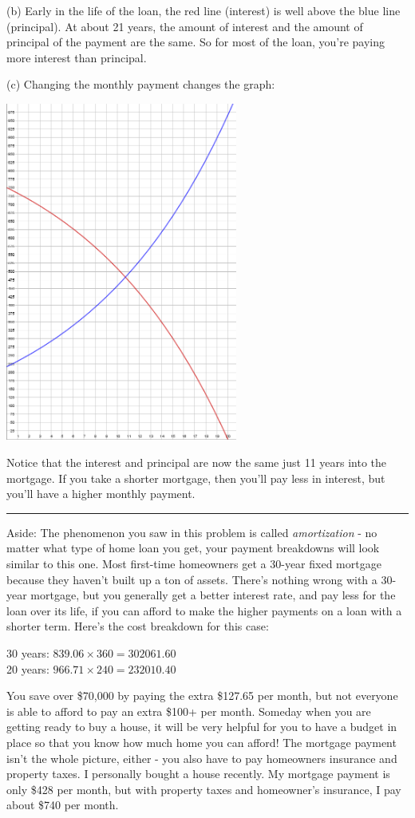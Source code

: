 \documentclass[12pt]{letter}
\newcommand{\?}{\stackrel{?}{=}}
\begin{document}
	(b) Early in the life of the loan, the red line (interest) is well above the blue line (principal). At about 21 years, the amount of interest and the amount of principal of the payment are the same. So for most of the loan, you're paying more interest than principal.
	
	\vfill \newpage
	
	(c) Changing the monthly payment changes the graph:
	
	\includegraphics[width=3in]{5558c.png}
	
	Notice that the interest and principal are now the same just 11 years into the mortgage. If you take a shorter mortgage, then you'll pay less in interest, but you'll have a higher monthly payment. \\ \hrule
	
	Aside: The phenomenon you saw in this problem is called \textit{amortization} - no matter what type of home loan you get, your payment breakdowns will look similar to this one. Most first-time homeowners get a 30-year fixed mortgage because they haven't built up a ton of assets. There's nothing wrong with a 30-year mortgage, but you generally get a better interest rate, and pay less for the loan over its life, if you can afford to make the higher payments on a loan with a shorter term. Here's the cost breakdown for this case:
	
	30 years: $839.06\times 360 = 302061.60$ \\
	20 years: $966.71 \times 240 = 232010.40$
	
	You save over \$70,000 by paying the extra \$127.65 per month, but not everyone is able to afford to pay an extra \$100+ per month. Someday when you are getting ready to buy a house, it will be very helpful for you to have a budget in place so that you know how much home you can afford! The mortgage payment isn't the whole picture, either - you also have to pay homeowners insurance and property taxes. I personally bought a house recently. My mortgage payment is only \$428 per month, but with property taxes and homeowner's insurance, I pay about \$740 per month.
	
	
\end{document}
